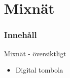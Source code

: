 \section{Mixnät}
\begin{frame}
\frametitle{Innehåll}
\tableofcontents[currentsection]
\end{frame}

\begin{frame}{Mixnät - översiktligt}

\begin{itemize}
\item Digital tombola
\end{itemize}

\begin{center}
\end{center}


\end{frame}
